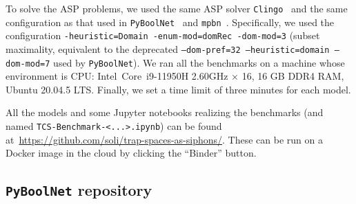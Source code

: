\documentclass[preprint,12pt]{elsarticle}
\begin{document}
To solve the ASP problems, we used the same ASP solver \texttt{Clingo}~\cite{DBLP:journals/aicom/GebserKKOSS11} and the same configuration as that used in \texttt{PyBoolNet}~\cite{klarner2015computing,klarner2017pyboolnet} and \texttt{mpbn}~\cite{Paulev2020}.
Specifically, we used the configuration \texttt{-heuristic=Domain -enum-mod=domRec -dom-mod=3} (subset maximality, equivalent to the deprecated \texttt{--dom-pref=32 --heuristic=domain --dom-mod=7} used by \texttt{PyBoolNet}).
We ran all the benchmarks on a machine whose environment is CPU\@: Intel\textregistered\ Core\texttrademark\ i9-11950H 2.60GHz × 16, 16 GB DDR4 RAM, Ubuntu 20.04.5 LTS\@.
Finally, we set a time limit of three minutes for each model.

All the models and some Jupyter notebooks realizing the benchmarks (and named \texttt{TCS-Benchmark-<...>.ipynb}) can be found at~\url{https://github.com/soli/trap-spaces-as-siphons/}.
These can be run on a Docker image in the cloud by clicking the ``Binder'' button.

\subsection{\texttt{PyBoolNet} repository}
\end{document}
